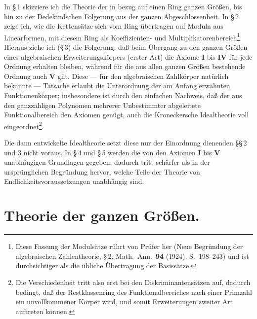 \documentclass[12pt,a4paper]{article}
\theoremstyle{plain}
\theoremstyle{definition}
\theoremstyle{remark}
\begin{document}
In \S\,1 skizziere ich die Theorie der in bezug auf einen Ring ganzen Größen, bis hin zu der Dedekindschen Folgerung aus der ganzen Abgeschlossenheit. In \S\,2 zeige ich, wie die Kettensätze sich vom Ring übertragen auf Moduln aus Linearformen, mit diesem Ring als Koeffizienten- und Multiplikatorenbereich\footnote{Diese Fassung der Modulsätze rührt von Prüfer her (Neue Begründung der algebraischen Zahlentheorie, \S\,2, Math.\ Ann.\ \textbf{94} (1924), S.~198--243) und ist durchsichtiger als die übliche Übertragung der Basissätze.}. Hieraus ziehe ich (\S\,3) die Folgerung, daß beim Übergang zu den ganzen Größen eines algebraischen Erweiterungskörpers (erster Art) die Axiome \textbf{I} bis \textbf{IV} für jede Ordnung erhalten bleiben, während für die aus allen ganzen Größen bestehende Ordnung auch \textbf{V} gilt. Diese --- für den algebraischen Zahlkörper natürlich bekannte --- Tatsache erlaubt die Unterordnung der am Anfang erwähnten Funktionenkörper; insbesondere ist durch den einfachen Nachweis, daß der aus den ganzzahligen Polynomen mehrerer Unbestimmter abgeleitete Funktionalbereich den Axiomen genügt, auch die Kroneckersche Idealtheorie voll eingeordnet\footnote{Die Verschiedenheit tritt also erst bei den Diskriminantensätzen auf, dadurch bedingt, daß der Restklassenring des Funktionalbereiches nach einer Primzahl ein unvollkommener Körper wird, und somit Erweiterungen zweiter Art auftreten können.}.

Die dann entwickelte Idealtheorie setzt diese nur der Einordnung dienenden \S\S\,2 und 3 nicht voraus. In \S\,4 und \S\,5 werden die von den Axiomen \textbf{I} bis \textbf{V} unabhängigen Grundlagen gegeben; dadurch tritt schärfer als in der ursprünglichen Begründung hervor, welche Teile der Theorie von Endlichkeitsvoraussetzungen unabhängig sind.

\newpage
\section{Theorie der ganzen Größen.}
\end{document}
